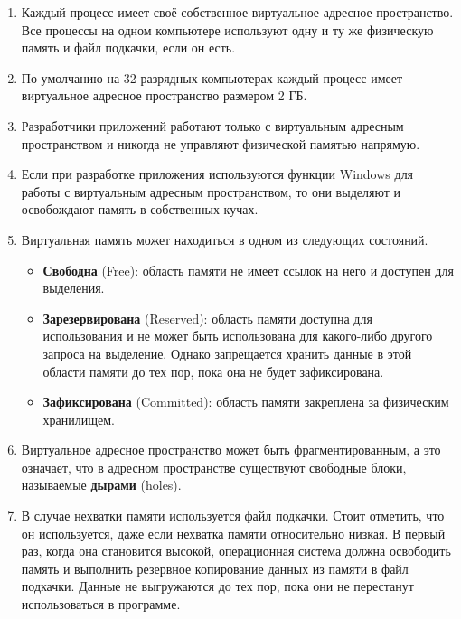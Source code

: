 \begin{enumerate}[label*=\arabic*.]
	\item Каждый процесс имеет своё собственное виртуальное адресное пространство. Все процессы на одном компьютере используют одну и ту же физическую память и файл подкачки, если он есть.
	
	\item По умолчанию на 32-разрядных компьютерах каждый процесс имеет виртуальное адресное пространство размером 2 ГБ.
	
	\item Разработчики приложений работают только с виртуальным адресным пространством и никогда не управляют физической памятью напрямую.
	
	\item Если при разработке приложения используются функции Windows для работы с виртуальным адресным пространством, то они выделяют и освобождают память в собственных кучах.
	
	\item Виртуальная память может находиться в одном из следующих состояний.
	\begin{itemize}[label*=---]
		\item \textbf{Свободна} (Free): область памяти не имеет ссылок на него и доступен для выделения.
		\item \textbf{Зарезервирована} (Reserved): область памяти доступна для использования и не может быть использована для какого-либо другого запроса на выделение. Однако запрещается хранить данные в этой области памяти до тех пор, пока она не будет зафиксирована.
		\item \textbf{Зафиксирована} (Committed): область памяти закреплена за физическим хранилищем.
	\end{itemize}
	
	\item Виртуальное адресное пространство может быть фрагментированным, а это означает, что в адресном пространстве существуют свободные блоки, называемые \textbf{дырами} (holes).
	
	\item В случае нехватки памяти используется файл подкачки. Стоит отметить, что он используется, даже если нехватка памяти относительно низкая. В первый раз, когда она становится высокой, операционная система должна освободить память и выполнить резервное копирование данных из памяти в файл подкачки. Данные не выгружаются до тех пор, пока они не перестанут использоваться в программе.
\end{enumerate}

